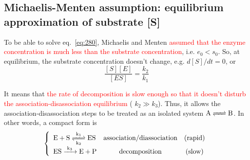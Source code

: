 \subsection[Michaelis-Menten assumption]{Michaelis-Menten assumption:
equilibrium approximation of substrate [S]}
\label{sec:equil-appr}
\label{sec:Michaelis-Menten-formula}

To be able to solve eq.~\eqref{eq:280}, Michaelis and Menten
\textcolor{red}{assumed that the enzyme concentration is much less than the
substrate concentration}, i.e. $e_0 < s_0$. So, at equilibrium, 
the substrate concentration doesn't change,
e.g. $d[S]/dt=0$, or
\begin{equation}
  \label{eq:281}
  \frac{[S][E]}{[ES]} = \frac{k_{2}}{k_1}
\end{equation}

It means that 
\textcolor{red}{the rate of decomposition is slow enough so that it
  doesn't disturb the association-disassociation equilibrium}
( $k_{2} \gg k_3$).  Thus, it allows the association-disassociation
steps to be treated as an isolated system $\ce{A <=> B}$.  In other
words, a compact form is
\begin{eqnarray}
  \label{eq:263-c}
    \left\{  
    \begin{array}{lcc}
      \ce{E + S <=>[k_1][k_2] ES} & \text{association/diassociation} & \text{(rapid)} \\
      \ce{ES ->[k_3] E + P} & \text{decomposition} & \text{(slow)}
    \end{array}
\right.
\end{eqnarray}



